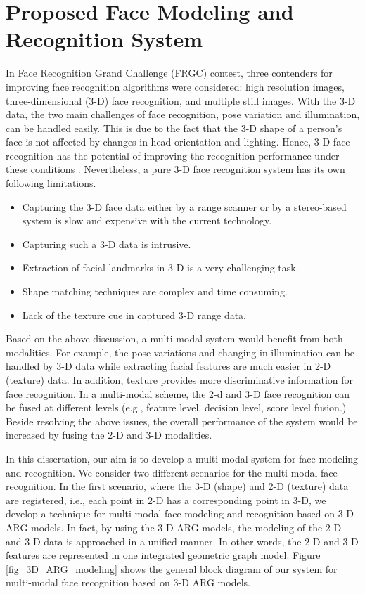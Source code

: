 \section{Proposed Face Modeling and Recognition System}
In Face Recognition Grand Challenge (FRGC) contest, three contenders
for improving face recognition algorithms were considered: high
resolution images, three-dimensional (3-D) face recognition, and
multiple still images. With the 3-D data, the two main challenges of
face recognition, pose variation and illumination, can be handled
easily. This is due to the fact that the 3-D shape of a person's
face is not affected by changes in head orientation and lighting.
Hence, 3-D face recognition has the potential of improving the
recognition performance under these conditions
\cite{3DFaceSurvey2006}. Nevertheless, a pure 3-D face recognition
system has its own following limitations.

\begin{itemize}
\item Capturing the 3-D face data either by a range scanner or by a stereo-based system is slow and expensive
with the current technology.
\item Capturing such a 3-D data is intrusive.
\item Extraction of facial landmarks in 3-D is a very challenging task.
\item Shape matching techniques are complex and time consuming.
\item Lack of the texture cue in captured 3-D range data.
\end{itemize}

Based on the above discussion, a multi-modal system would benefit
from both modalities. For example, the pose variations and changing
in illumination can be handled by 3-D data while extracting facial
features are much easier in 2-D (texture) data. In addition, texture
provides more discriminative information for face recognition. In a
multi-modal scheme, the 2-d and 3-D face recognition can be fused at
different levels (e.g., feature level, decision level, score level
fusion.) Beside resolving the above issues, the overall performance
of the system would be increased by fusing the 2-D and 3-D
modalities.

In this dissertation, our aim is to develop a multi-modal system for
face modeling and recognition. We consider two different scenarios
for the multi-modal face recognition. In the first scenario, where
the 3-D (shape) and 2-D (texture) data are registered, i.e., each
point in 2-D has a corresponding point in 3-D, we develop a
technique for multi-modal face modeling and recognition based on 3-D
ARG models. In fact, by using the 3-D ARG models, the modeling of
the 2-D and 3-D data is approached in a unified manner. In other
words, the 2-D and 3-D features are represented in one integrated
geometric graph model. Figure \ref{fig_3D_ARG_modeling} shows the
general block diagram of our system for multi-modal face recognition
based on 3-D ARG models.

